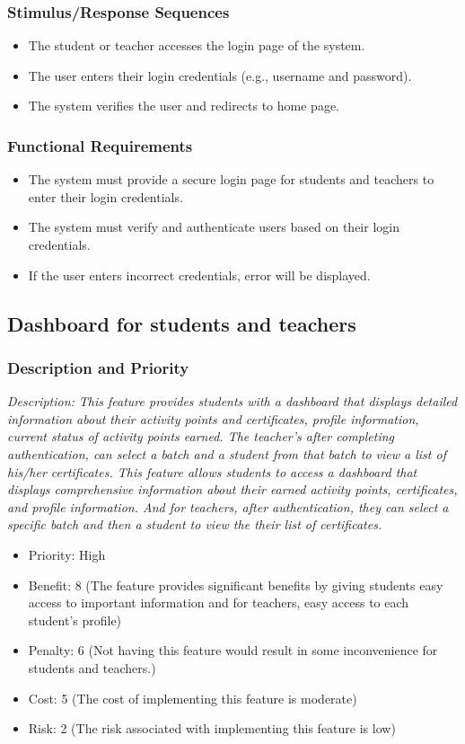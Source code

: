 \documentclass{article}
\begin{document}
\subsubsection{Stimulus/Response Sequences}
\begin{itemize}
  \item The student or teacher accesses the login page of the system.
  \item The user enters their login credentials (e.g., username and password).
  \item The system verifies the user and redirects to home page.
\end{itemize}

\subsubsection{Functional Requirements}
\begin{itemize}
\item The system must provide a secure login page for students and teachers to enter their login credentials.
\item The system must verify and authenticate users based on their login credentials.
\item If the user enters incorrect credentials, error will be displayed.
\end{itemize}




\subsection{Dashboard for students and teachers}
\subsubsection{Description and Priority}
\emph{Description: This feature provides students with a dashboard that displays detailed information about their activity points and certificates, profile information, current status of activity points earned. The teacher's after completing authentication, can select a batch and a student from that batch to view a list of his/her certificates.
This feature allows students to access a dashboard that displays comprehensive information about their earned activity points, certificates, and profile information. And for teachers, after authentication, they can select a specific batch and then a student to view the their list of certificates.}
\begin{itemize}
  \item Priority: High
  \item Benefit:  8 (The feature provides significant benefits by giving students easy access to important information and for teachers, easy access to each student's profile)
  \item Penalty: 6 (Not having this feature would result in some inconvenience for students and teachers.)
  \item Cost:  5 (The cost of implementing this feature is moderate)
  \item Risk: 2 (The risk associated with implementing this feature is low)
\end{itemize}
\end{document}
